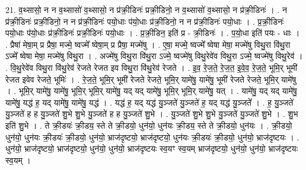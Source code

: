 \documentclass[17pt]{extarticle}
\begin{document}
21. व॒थ्सासो॒ न न व॒थ्सासो॑ व॒थ्सासो॒ न प्र॑क्री॒डिनः॑ प्रक्री॒डिनो॒ न व॒थ्सासो॑ व॒थ्सासो॒ न प्र॑क्री॒डिनः॑ । . न प्र॑क्री॒डिनः॑ प्रक्री॒डिनो॒ न न प्र॑क्री॒डिनः॑ पयो॒धाः प॑यो॒धाः प्र॑क्री॒डिनो॒ न न प्र॑क्री॒डिनः॑ पयो॒धाः । . प्र॒क्री॒डिनः॑ पयो॒धाः प॑यो॒धाः प्र॑क्री॒डिनः॑ प्रक्री॒डिनः॑ पयो॒धाः । . प्र॒क्री॒डिन॒ इति॑ प्र - क्री॒डिनः॑ । . प॒यो॒धा इति॑ पयः - धाः । . प्रैषा॑ मेषा॒म् प्र प्रैषा॒ मज्मे॒ ष्वज्मे᳚ ष्वेषा॒म् प्र प्रैषा॒ मज्मे॑षु । . ए॒षा॒ मज्मे॒ ष्वज्मे᳚ ष्वेषा मेषा॒ मज्मे॑षु विथु॒रा वि॑थु॒रा ऽज्मे᳚ ष्वेषा मेषा॒ मज्मे॑षु विथु॒रा । . अज्मे॑षु विथु॒रा वि॑थु॒रा ऽज्मे॒ ष्वज्मे॑षु विथु॒रेवे॑व विथु॒रा ऽज्मे॒ ष्वज्मे॑षु विथु॒रेव॑ । . वि॒थु॒रेवे॑व विथु॒रा वि॑थु॒रेव॑ रेजते रेजत इव विथु॒रा वि॑थु॒रेव॑ रेजते । . इ॒व॒ रे॒ज॒ते॒ रे॒ज॒त॒ इ॒वे॒व॒ रे॒ज॒ते॒ भूमि॒र् भूमी॑ रेजत इवेव रेजते॒ भूमिः॑ । . रे॒ज॒ते॒ भूमि॒र् भूमी॑ रेजते रेजते॒ भूमि॒र् यामे॑षु॒ यामे॑षु॒ भूमी॑ रेजते रेजते॒ भूमि॒र् यामे॑षु । . भूमि॒र् यामे॑षु॒ यामे॑षु॒ भूमि॒र् भूमि॒र् यामे॑षु॒ यद् यद् यामे॑षु॒ भूमि॒र् भूमि॒र् यामे॑षु॒ यत् । . यामे॑षु॒ यद् यद् यामे॑षु॒ यामे॑षु॒ यद्ध॑ ह॒ यद् यामे॑षु॒ यामे॑षु॒ यद्ध॑ । . यद्ध॑ ह॒ यद् यद्ध॑ यु॒ञ्जते॑ यु॒ञ्जते॑ ह॒ यद् यद्ध॑ यु॒ञ्जते᳚ । . ह॒ यु॒ञ्जते॑ यु॒ञ्जते॑ ह ह यु॒ञ्जते॑ शु॒भे शु॒भे यु॒ञ्जते॑ ह ह यु॒ञ्जते॑ शु॒भे । . यु॒ञ्जते॑ शु॒भे शु॒भे यु॒ञ्जते॑ यु॒ञ्जते॑ शु॒भे । . शु॒भ इति॑ शु॒भे । . ते क्री॒डयः॑ क्री॒डय॒ स्ते ते क्री॒डयो॒ धुन॑यो॒ धुन॑यः क्री॒डय॒ स्ते ते क्री॒डयो॒ धुन॑यः । . क्री॒डयो॒ धुन॑यो॒ धुन॑यः क्री॒डयः॑ क्री॒डयो॒ धुन॑यो॒ भ्राज॑दृष्टयो॒ भ्राज॑दृष्टयो॒ धुन॑यः क्री॒डयः॑ क्री॒डयो॒ धुन॑यो॒ भ्राज॑दृष्टयः । . धुन॑यो॒ भ्राज॑दृष्टयो॒ भ्राज॑दृष्टयो॒ धुन॑यो॒ धुन॑यो॒ भ्राज॑दृष्टयः स्व॒यꣳ स्व॒यम् भ्राज॑दृष्टयो॒ धुन॑यो॒ धुन॑यो॒ भ्राज॑दृष्टयः स्व॒यम् । \newline
\end{document}

